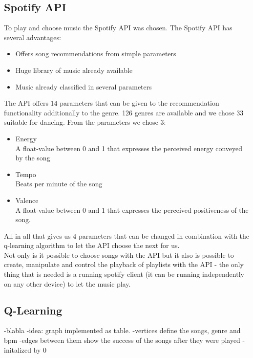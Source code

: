 \documentclass{article}
\begin{document}
\subsection{Spotify API}

To play and choose music the Spotify API was chosen. The Spotify API has several advantages: 
\begin{itemize}
    \item Offers song recommendations from simple parameters
    \item Huge library of music already available
    \item Music already classified in several parameters
\end{itemize}
The API offers 14 parameters that can be given to the recommendation functionality additionally to the genre. 126 genres are available and we chose 33 suitable for dancing. From the parameters we chose 3:
\begin{itemize}
    \item Energy\\
        A float-value between 0 and 1 that expresses the perceived energy conveyed by the song
    \item Tempo\\
        Beats per minute of the song
    \item Valence\\
        A float-value between 0 and 1 that expresses the perceived positiveness of the song.
\end{itemize}
All in all that gives us 4 parameters that can be changed in combination with the q-learning algorithm to let the API choose the next for us. \\
Not only is it possible to choose songs with the API but it also is possible to create, manipulate and control the playback of playlists with the API - the only thing that is needed is a running spotify client (it can be running independently on any other device) to let the music play.

\subsection{Q-Learning}

-blabla
-idea: graph implemented as table.
-vertices define the songs, genre and bpm
-edges between them show the success of the songs after they were played
-initalized by 0
\end{document}

